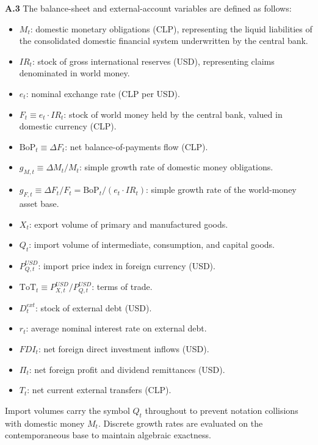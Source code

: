 \textbf{A.3} The balance-sheet and external-account variables are defined as follows:
\begin{itemize}[leftmargin=2em]
	\item $M_t$: domestic monetary obligations (CLP), representing the liquid liabilities of the consolidated domestic financial system underwritten by the central bank.
	\item $IR_t$: stock of gross international reserves (USD), representing claims denominated in world money.
	\item $e_t$: nominal exchange rate (CLP per USD).
	\item $F_t \equiv e_t \cdot IR_t$: stock of world money held by the central bank, valued in domestic currency (CLP).
	\item $\text{BoP}_t \equiv \Delta F_t$: net balance-of-payments flow (CLP).
	\item $g_{M,t} \equiv \Delta M_t / M_t$: simple growth rate of domestic money obligations.
	\item $g_{F,t} \equiv \Delta F_t / F_t = \text{BoP}_t / (e_t \cdot IR_t)$: simple growth rate of the world-money asset base.
	\item $X_t$: export volume of primary and manufactured goods.
	\item $Q_t$: import volume of intermediate, consumption, and capital goods.
	\item $P_{Q,t}^{USD}$: import price index in foreign currency (USD).
	\item $\text{ToT}_t \equiv P_{X,t}^{USD} / P_{Q,t}^{USD}$: terms of trade.
	\item $D_t^{ext}$: stock of external debt (USD).
	\item $r_t$: average nominal interest rate on external debt.
	\item $FDI_t$: net foreign direct investment inflows (USD).
	\item $\Pi_t$: net foreign profit and dividend remittances (USD).
	\item $T_t$: net current external transfers (CLP).
\end{itemize}

Import volumes carry the symbol $Q_t$ throughout to prevent notation collisions with domestic money $M_t$. Discrete growth rates are evaluated on the contemporaneous base to maintain algebraic exactness.

